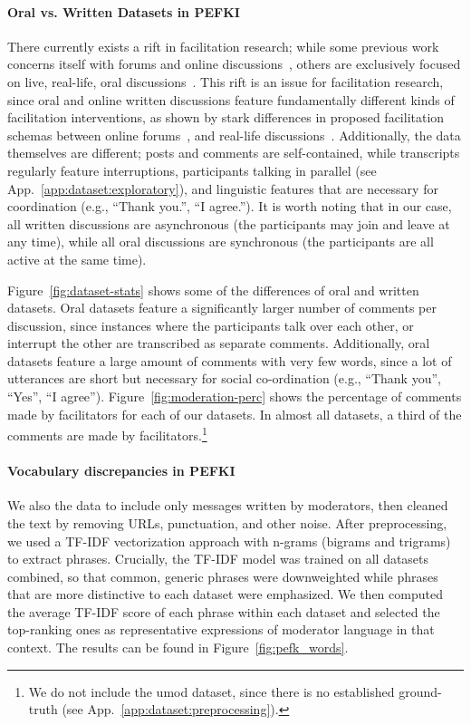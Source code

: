 \documentclass[11pt]{article}
\theoremstyle{definition}
\theoremstyle{plain}
\begin{document}
\paragraph{Oral vs. Written Datasets in PEFKI}	
There currently exists a rift in facilitation research; while some previous work concerns itself with forums and online discussions~\citep{ceri}, others are exclusively focused on live, real-life, oral discussions~\citep{schroeder-etal-2024-fora, chen-etal-2025-whow}. This rift is an issue for facilitation research, since oral and online written discussions feature fundamentally different kinds of facilitation interventions, as shown by stark differences in proposed facilitation schemas between online forums~\citep{ceri}, and real-life discussions~\citep{schroeder-etal-2024-fora, chen-etal-2025-whow}. Additionally, the data themselves are different; posts and comments are self-contained, while transcripts regularly feature interruptions, participants talking in parallel (see App.~\ref{app:dataset:exploratory}), and linguistic features that are necessary for coordination (e.g., ``Thank you.'', ``I agree.''). It is worth noting that in our case, all written discussions are asynchronous (the participants may join and leave at any time), while all oral discussions are synchronous (the participants are all active at the same time).

Figure~\ref{fig:dataset-stats} shows some of the differences of oral and written datasets. Oral datasets feature a significantly larger number of comments per discussion, since instances where the participants talk over each other, or interrupt the other are transcribed as separate comments. Additionally, oral datasets feature a large amount of comments with very few words, since a lot of utterances are short but necessary for social co-ordination (e.g., ``Thank you'', ``Yes'', ``I agree''). Figure~\ref{fig:moderation-perc} shows the percentage of comments made by facilitators for each of our datasets. In almost all datasets, a third of the comments are made by facilitators.\footnote{We do not include the \ac{umod} dataset, since there is no established ground-truth (see App.~\ref{app:dataset:preprocessing}).}

\paragraph{Vocabulary discrepancies in PEFKI}
We also the data to include only messages written by moderators, then cleaned the text by removing URLs, punctuation, and other noise. After preprocessing, we used a TF-IDF vectorization approach with n-grams (bigrams and trigrams) to extract phrases. Crucially, the TF-IDF model was trained on all datasets combined, so that common, generic phrases were downweighted while phrases that are more distinctive to each dataset were emphasized. We then computed the average TF-IDF score of each phrase within each dataset and selected the top-ranking ones as representative expressions of moderator language in that context. The results can be found in Figure~\ref{fig:pefk_words}.
\end{document}
